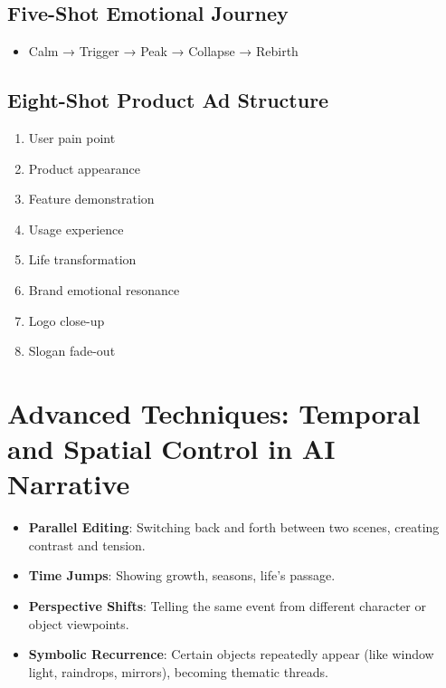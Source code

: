 \subsection{Five-Shot Emotional Journey}

\begin{itemize}
\item Calm → Trigger → Peak → Collapse → Rebirth
\end{itemize}

\subsection{Eight-Shot Product Ad Structure}

\begin{enumerate}
\item User pain point
\item Product appearance
\item Feature demonstration
\item Usage experience
\item Life transformation
\item Brand emotional resonance
\item Logo close-up
\item Slogan fade-out
\end{enumerate}

\section{Advanced Techniques: Temporal and Spatial Control in AI Narrative}
\label{sec:advanced-techniques}

\begin{itemize}
\item \textbf{Parallel Editing}: Switching back and forth between two scenes, creating contrast and tension.

\item \textbf{Time Jumps}: Showing growth, seasons, life's passage.

\item \textbf{Perspective Shifts}: Telling the same event from different character or object viewpoints.

\item \textbf{Symbolic Recurrence}: Certain objects repeatedly appear (like window light, raindrops, mirrors), becoming thematic threads.
\end{itemize}

